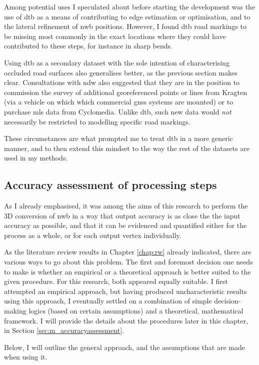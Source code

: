 Among potential uses I speculated about before starting the development was the use of \ac{dtb} as a means of contributing to edge estimation or optimisation, and to the lateral refinement of \ac{nwb} positions. However, I found \ac{dtb} road markings to be missing most commonly in the exact locations where they could have contributed to these steps, for instance in sharp bends.

Using \ac{dtb} as a secondary dataset with the sole intention of characterising occluded road surfaces also generalises better, as the previous section makes clear. Consultations with \ac{ndw} also suggested that they are in the position to commission the survey of additional georeferenced points or lines from Kragten (via a vehicle on which which commercial \ac{gnss} systems are mounted) or to purchase \ac{mls} data from Cyclomedia. Unlike \ac{dtb}, such new data would \textit{not} necessarily be restricted to modelling specific road markings.

These circumstances are what prompted me to treat \ac{dtb} in a more generic manner, and to then extend this mindset to the way the rest of the datasets are used in my methods.

\subsection{Accuracy assessment of processing steps}
\label{sub:accuracyoverview}

As I already emphasised, it was among the aims of this research to perform the 3D conversion of \ac{nwb} in a way that output accuracy is as close the the input accuracy as possible, and that it can be evidenced and quantified either for the process as a whole, or for each output vertex individually.

As the literature review results in Chapter \ref{chap:rw} already indicated, there are various ways to go about this problem. The first and foremost decision one needs to make is whether an empirical or a theoretical approach is better suited to the given procedure. For this research, both appeared equally suitable. I first attempted an empirical approach, but having produced uncharacteristic results using this approach, I eventually settled on a combination of simple decision-making logics (based on certain assumptions) and a theoretical, mathematical framework. I will provide the details about the procedures later in this chapter, in Section \ref{sec:m_accuracyassessment}.

Below, I will outline the general approach, and the assumptions that are made when using it.

